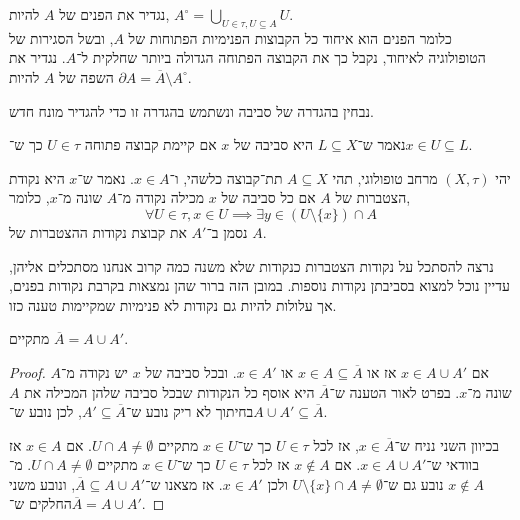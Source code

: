 \begin{definition}
	נגדיר את הפנים של $A$ להיות, $A^\circ = \bigcup_{U \in \tau, U \subseteq A} U$. \\
	כלומר הפנים הוא איחוד כל הקבוצות הפנימיות הפתוחות של $A$, ובשל הסגירות של הטופולוגיה לאיחוד, נקבל כך את הקבוצה הפתוחה הגדולה ביותר שחלקית ל־$A$.
	נגדיר את השפה של $A$ להיות $\partial A = \overline{A} \setminus A^\circ$.
\end{definition}
נבחין בהגדרה של סביבה ונשתמש בהגדרה זו כדי להגדיר מונח חדש.
\begin{definition}
	נאמר ש־$L \subseteq X$ היא סביבה של $x$ אם קיימת קבוצה פתוחה $U \in \tau$ כך ש־$x \in U \subseteq L$.
\end{definition}
\begin{definition}
	יהי $(X, \tau)$ מרחב טופולוגי, תהי $A \subseteq X$ תת־קבוצה כלשהי, ו־$x \in A$.
	נאמר ש־$x$ היא נקודת הצטברות של $A$ אם כל סביבה של $x$ מכילה נקודה מ־$A$ שונה מ־$x$, כלומר,
	\[
		\forall U \in \tau, x \in U \implies \exists y \in (U \setminus \{ x \}) \cap A
	\]
	נסמן ב־$A'$ את קבוצת נקודות ההצטברות של $A$.
\end{definition}
נרצה להסתכל על נקודות הצטברות כנקודות שלא משנה כמה קרוב אנחנו מסתכלים אליהן, עדיין נוכל למצוא בסביבתן נקודות נוספות. במובן הזה ברור שהן נמצאות בקרבת נקודות בפנים, אך עלולות להיות גם נקודות לא פנימיות שמקיימות טענה כזו.
\begin{proposition}
	מתקיים $\overline{A} = A \cup A'$.
\end{proposition}
\begin{proof}
	אם $x \in A \cup A'$ אז או $x \in A \subseteq \overline{A}$ או $x \in A'$.
	ובכל סביבה של $x$ יש נקודה מ־$A$ שונה מ־$x$.
	בפרט לאור הטענה ש־$\overline{A}$ היא אוסף כל הנקודות שבכל סביבה שלהן המכילה את $A$ בחיתוך לא ריק נובע ש־$A' \subseteq \overline{A}$, לכן נובע ש־$A \cup A' \subseteq \overline{A}$.

	בכיוון השני נניח ש־$x \in \overline{A}$, אז לכל $U \in \tau$ כך ש־$x \in U$ מתקיים $U \cap A \ne \emptyset$.
	אם $x \in A$ אז בוודאי ש־$x \in A \cup A'$.
	אם $x \notin A$ אז לכל $U \in \tau$ כך ש־$x \in U$ מתקיים $U \cap A \ne \emptyset$.
	מ־$x \notin A$ נובע גם ש־$U \setminus \{ x \} \cap A \ne \emptyset$ ולכן $x \in A'$.
	אז מצאנו ש־$\overline{A} \subseteq A \cup A'$, ונובע משני החלקים ש־$\overline{A} = A \cup A'$.
\end{proof}

